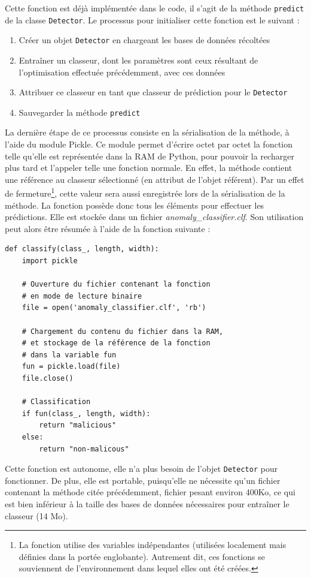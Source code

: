 \documentclass[a4paper]{report}
\begin{document}
Cette fonction est déjà implémentée dans le code, il s'agit de la méthode \texttt{predict} de la classe \texttt{Detector}. Le processus pour initialiser cette fonction est le suivant :
\begin{enumerate}
\item Créer un objet \texttt{Detector} en chargeant les bases de données récoltées
\item Entraîner un classeur, dont les paramètres sont ceux résultant de l'optimisation effectuée précédemment, avec ces données
\item Attribuer ce classeur en tant que classeur de prédiction pour le \texttt{Detector}
\item Sauvegarder la méthode \texttt{predict}
\end{enumerate}
La dernière étape de ce processus consiste en la sérialisation de la méthode, à l'aide du module Pickle. Ce module permet d'écrire octet par octet la fonction telle qu'elle est représentée dans la RAM de Python, pour pouvoir la recharger plus tard et l'appeler telle une fonction normale. En effet, la méthode contient une référence au classeur sélectionné (en attribut de l'objet référent). Par un effet de fermeture\footnote{La fonction utilise des variables indépendantes (utilisées localement mais définies dans la portée englobante). Autrement dit, ces fonctions se souviennent de l'environnement dans lequel elles ont été créées.}, cette valeur sera aussi enregistrée lors de la sérialisation de la méthode. La fonction possède donc tous les éléments pour effectuer les prédictions. Elle est stockée dans un fichier \emph{anomaly\_classifier.clf}. Son utilisation peut alors être résumée à l'aide de la fonction suivante :
\begin{verbatim}
def classify(class_, length, width):
    import pickle
    
    # Ouverture du fichier contenant la fonction
    # en mode de lecture binaire
    file = open('anomaly_classifier.clf', 'rb')
    
    # Chargement du contenu du fichier dans la RAM,
    # et stockage de la référence de la fonction
    # dans la variable fun
    fun = pickle.load(file)
    file.close()
    
    # Classification
    if fun(class_, length, width):
        return "malicious"
    else:
        return "non-malicous"
\end{verbatim}
Cette fonction est autonome, elle n'a plus besoin de l'objet \texttt{Detector} pour fonctionner. De plus, elle est portable, puisqu'elle ne nécessite qu'un fichier contenant la méthode citée précédemment, fichier pesant environ 400Ko, ce qui est bien inférieur à la taille des bases de données nécessaires pour entraîner le classeur (14 Mo).
\end{document}
